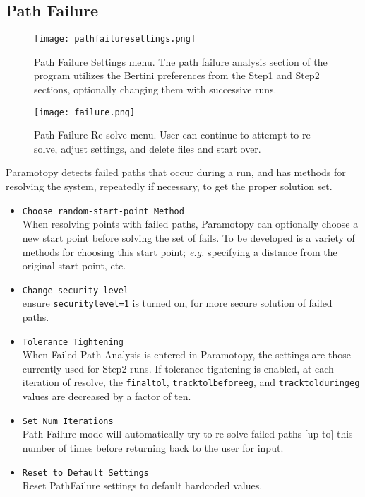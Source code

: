 \subsection{Path Failure}

\begin{figure}[h]
\begin{center}
\texttt{[image: pathfailuresettings.png]}
\caption[Path Failure Settings]{Path Failure Settings menu.  The path failure analysis section of the program utilizes the Bertini preferences from the Step1 and Step2 sections, optionally changing them with successive runs.}
\label{screen:pathfailuremenu}
\end{center}
\end{figure}

\begin{figure}[h]
\begin{center}
\texttt{[image: failure.png]}
\caption[Path Failure Re-solve Menu]{Path Failure Re-solve menu.  User can continue to attempt to re-solve, adjust settings, and delete files and start over.}
\label{screen:failure}
\end{center}
\end{figure}

Paramotopy detects failed paths that occur during a run, and has methods for resolving the system, repeatedly if necessary, to get the proper solution set. 

\begin{itemize}
	\item \texttt{Choose random-start-point Method} \\ When resolving points with failed paths, Paramotopy can optionally choose a new start point before solving the set of fails.  To be developed is a variety of methods for choosing this start point; {\em e.g.} specifying a distance from the original start point, etc.
	\item \texttt{Change security level} \\ ensure \texttt{securitylevel=1} is turned on, for more secure solution of failed paths.
	\item \texttt{Tolerance Tightening} \\ When Failed Path Analysis is entered in Paramotopy, the settings are those currently used for Step2 runs.  If tolerance tightening is enabled, at each iteration of resolve, the \texttt{finaltol}, \texttt{tracktolbeforeeg}, and \texttt{tracktolduringeg} values are decreased by a factor of ten.  
	\item \texttt{Set Num Iterations}  \\ Path Failure mode will automatically try  to re-solve failed paths [up to] this number of times before returning back to the user for input.
	\item \texttt{Reset to Default Settings} \\ Reset PathFailure settings to default hardcoded values.
\end{itemize}

